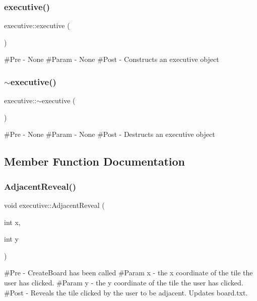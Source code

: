 \subsubsection{\texorpdfstring{executive()}{executive()}}
{\footnotesize\ttfamily executive\+::executive (\begin{DoxyParamCaption}{ }\end{DoxyParamCaption})}

\#\+Pre -\/ None \#\+Param -\/ None \#\+Post -\/ Constructs an executive object \mbox{\label{classexecutive_a0d6dc7441c758d7c1fa3a375720e6952}} 
\subsubsection{\texorpdfstring{$\sim$executive()}{~executive()}}
{\footnotesize\ttfamily executive\+::$\sim$executive (\begin{DoxyParamCaption}{ }\end{DoxyParamCaption})}

\#\+Pre -\/ None \#\+Param -\/ None \#\+Post -\/ Destructs an executive object 

\subsection{Member Function Documentation}
\mbox{\label{classexecutive_af6ca8c7e37912f612009a96a90113204}} 
\subsubsection{\texorpdfstring{AdjacentReveal()}{AdjacentReveal()}}
{\footnotesize\ttfamily void executive\+::\+Adjacent\+Reveal (\begin{DoxyParamCaption}\item[{int}]{x,  }\item[{int}]{y }\end{DoxyParamCaption})}

\#\+Pre -\/ Create\+Board has been called \#\+Param x -\/ the x coordinate of the tile the user has clicked. \#\+Param y -\/ the y coordinate of the tile the user has clicked. \#\+Post -\/ Reveals the tile clicked by the user to be adjacent. Updates board.\+txt. \mbox{\label{classexecutive_a75c3e0d1420e409b8e955fc88d885b8b}} 
